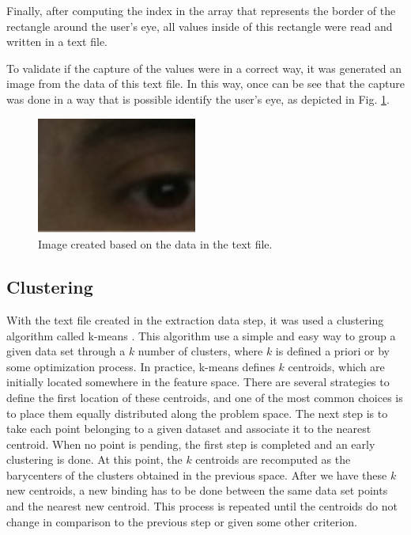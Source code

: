 \documentclass[10pt, conference]{IEEEtran}
\begin{document}
	Finally, after computing the index in the array that represents the border of the rectangle around the user's eye, all values inside of this rectangle were read and written in a text file. 

	To validate if the capture of the values were in a correct way, it was generated an image from the data of this text file. 
	In this way, once can be see that the capture was done in a way that is possible identify the user's eye, as depicted in Fig. \ref{fig:fig13}.

    \begin{figure}[t]
      \centering
      \includegraphics{figures/pic13.png}
      \caption{Image created based on the data in the text file.}
      \label{fig:fig13}
    \end{figure}

\subsection{Clustering}

	With the text file created in the extraction data step, it was used a clustering algorithm called k-means \cite{13}. 
	This algorithm use a simple and easy way to group a given data set through a $k$ number of clusters, where $k$ is defined a priori or by some optimization process.
	In practice, k-means defines $k$ centroids, which are initially located somewhere in the feature space.
    There are several strategies to define the first location of these centroids, and one of the most common choices is to place them equally distributed along the problem space.
	The next step is to take each point belonging to a given dataset and associate it to the nearest centroid. 
    When no point is pending, the first step is completed and an early clustering is done. 
	At this point, the $k$ centroids are recomputed as the barycenters of the clusters obtained in the previous space.
	After we have these $k$ new centroids, a new binding has to be done between the same data set points and the nearest new centroid. 
    This process is repeated until the centroids do not change in comparison to the previous step or given some other criterion.
\end{document}
